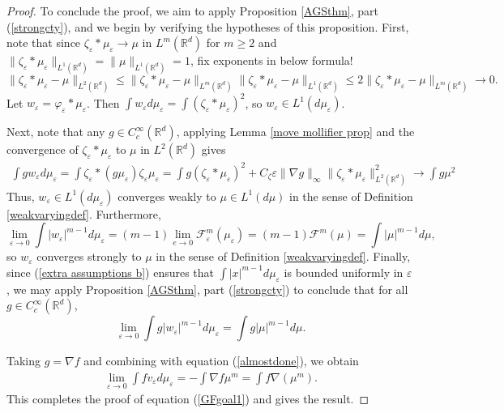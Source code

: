 \documentclass[11pt,leqno]{amsart}
\theoremstyle{definition}
\newcommand{\Rd}{{\mathord{\mathbb R}^d}}
\newcommand{\grad}{\nabla}
\newcommand{\F}{\mathcal{F}}
\def\e{\varepsilon}
\def\F{\mathcal{F}}
\begin{document}
\begin{proof}
To conclude the proof, we aim to apply Proposition \ref{AGSthm}, part (\ref{strongcty}), and we begin by verifying the hypotheses of this proposition. First, note that since $\zeta_\e*\mu_\e \to \mu$ in $L^m(\Rd)$ for $m \geq 2$ and  $\|\zeta_\e*\mu_\e \|_{L^1(\Rd)} = \|\mu\|_{L^1(\Rd)} = 1$, {\color{Aquamarine}  {fix exponents in below formula!}}
\[ \|\zeta_\e*\mu_\e - \mu\|_{L^2(\Rd)} \leq \|\zeta_\e*\mu_\e - \mu\|_{L^m(\Rd)}  \|\zeta_\e*\mu_\e - \mu\|_{L^1(\Rd)}  \leq 2\|\zeta_\e*\mu_\e - \mu\|_{L^m(\Rd)} \to 0 .\]
Let $w_\e = \varphi_\e*\mu_\e$. Then $\int w_\e d \mu_\e = \int (\zeta_\e*\mu_\e)^2$, so $w_\e \in L^1(d \mu_\e)$. 

Next, note that any $g \in C^\infty_c(\Rd)$, applying Lemma \ref{move mollifier prop} and the convergence of $\zeta_\e*\mu_\e$ to $\mu$ in $L^2(\Rd)$ gives
\begin{align*}
\int g w_\e d \mu_\e = \int \zeta_\e*(g \mu_\e) \zeta_\e \mu_\e = \int g (\zeta_\e*\mu_\e)^2 + C_\zeta \e \|\grad g\|_\infty \|\zeta_\e*\mu_\e\|_{L^2(\Rd)}^2  \to \int g \mu^2
\end{align*}
Thus, $w_\e \in L^1(d \mu_\e)$ converges weakly to $\mu \in L^1( d\mu)$ in the sense of Definition \ref{weakvaryingdef}. Furthermore, 
\[ \lim_{\e \to 0} \int |w_\e|^{m-1} d \mu_\e = (m-1) \lim_{e \to 0} \F^m_\e(\mu_\e) = (m-1) \F^m(\mu) = \int |\mu|^{m-1} d \mu,\]
so $w_\e$ converges strongly to $\mu$ in the sense of Definition \ref{weakvaryingdef}. Finally, since (\ref{extra assumptions b}) ensures that $\int |x|^{m-1} d \mu_\e$ is bounded uniformly in $\e$, we may apply Proposition \ref{AGSthm}, part (\ref{strongcty}) to conclude that for all $g \in C^\infty_c(\Rd)$,
\[ \lim_{\e \to 0} \int g |w_\e|^{m-1} d \mu_\e = \int g |\mu|^{m-1} d \mu . \]

Taking $g = \grad f$ and combining with equation (\ref{almostdone}), we obtain
\begin{align*}
\lim_{\e \to 0} \int f v_\e d \mu_\e = - \int \grad f \mu^m = \int f \grad (\mu^m).
\end{align*}
This completes the proof of equation (\ref{GFgoal1}) and gives the result.
\end{proof}
 
\end{document}
